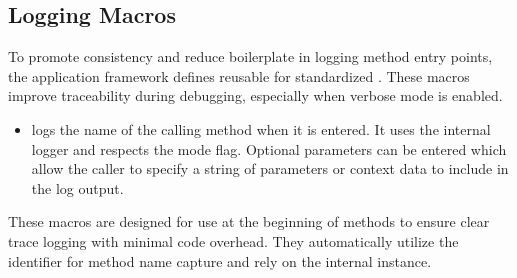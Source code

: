 \subsection{Logging Macros}
To promote consistency and reduce boilerplate in logging method entry points, the application framework defines reusable  for standardized . These macros improve traceability during debugging, especially when verbose mode is enabled.
\begin{itemize}\itemsep0em
    \item {} logs the name of the calling method when it is entered. It uses the internal logger and respects the  mode flag. Optional parameters can be entered which allow the caller to specify a string of parameters or context data to include in the log output.
\end{itemize}
These macros are designed for use at the beginning of methods to ensure clear trace logging with minimal code overhead. They automatically utilize the  identifier for method name capture and rely on the internal  instance.


